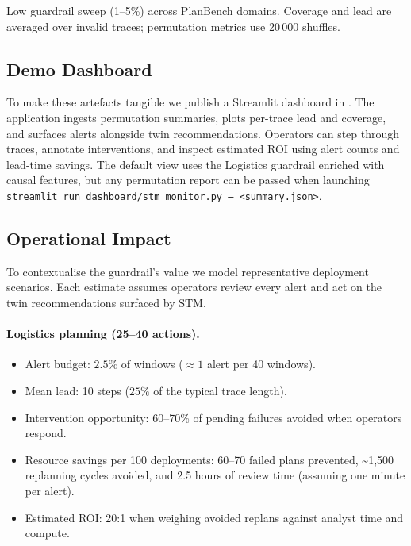 \documentclass[11pt]{article}
\begin{document}
\begin{table}[t]
  \centering
  \caption{Low guardrail sweep (1--5\%) across PlanBench domains. Coverage and lead are averaged over invalid traces; permutation metrics use 20\,000 shuffles.}
  \label{tab:guardrail-dynamic}
  
\end{table}

\subsection{Demo Dashboard}
\label{subsec:demo-dashboard}
To make these artefacts tangible we publish a Streamlit dashboard in
. The application ingests permutation summaries,
plots per-trace lead and coverage, and surfaces alerts alongside twin
recommendations. Operators can step through traces, annotate interventions, and
inspect estimated ROI using alert counts and lead-time savings. The default view
uses the Logistics guardrail enriched with causal features, but any permutation
report can be passed when launching
\mbox{\texttt{streamlit run dashboard/stm\_monitor.py -- <summary.json>}}.

\subsection{Operational Impact}
\label{subsec:operational-impact}
To contextualise the guardrail's value we model representative deployment
scenarios. Each estimate assumes operators review every alert and act on the twin
recommendations surfaced by STM.

\paragraph{Logistics planning (25--40 actions).}
\begin{itemize}
  \item Alert budget: $2.5\%$ of windows ($\approx 1$ alert per 40 windows).
  \item Mean lead: 10 steps ($25\%$ of the typical trace length).
  \item Intervention opportunity: 60--70\% of pending failures avoided when operators respond.
  \item Resource savings per 100 deployments: 60--70 failed plans prevented, \textasciitilde{}1,500 replanning cycles avoided, and 2.5 hours of review time (assuming one minute per alert).
  \item Estimated ROI: 20:1 when weighing avoided replans against analyst time and compute.
\end{itemize}
\end{document}
